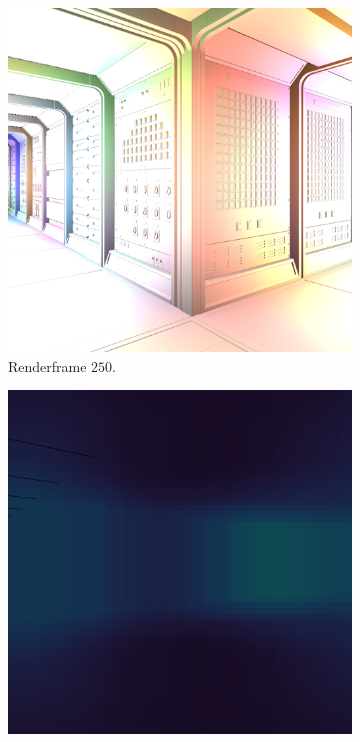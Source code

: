 \begin{figure}[t]
  \centering
  \begin{subfigure}[b]{0.35\textwidth}
    \includegraphics[width=\textwidth]{./img/raw/lc-frame-example/render/si_frame_250.png}
    \caption{Renderframe $250$.}
    \vspace{2pt}
    \label{fig:ts-test-frames-example:zc:250render}
  \end{subfigure}\quad %
  \begin{subfigure}[b]{0.35\textwidth}
    \includegraphics[width=\textwidth]{./img/raw/lc-frame-example/ts/si_frame_250.png}

\end{subfigure}
\end{figure}
